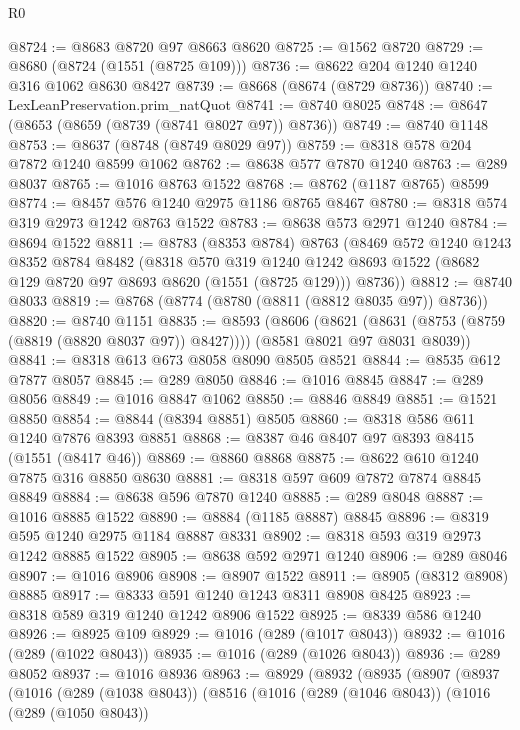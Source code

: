 \begin{lexlean}{R0}
\begin{coremodule}
@8724 := @8683 @8720 @97 @8663 @8620
@8725 := @1562 @8720
@8729 := @8680 (@8724 (@1551 (@8725 @109)))
@8736 := @8622 @204 @1240 @1240 @316 @1062 @8630 @8427
@8739 := @8668 (@8674 (@8729 @8736))
@8740 := LexLeanPreservation.prim_natQuot
@8741 := @8740 @8025
@8748 := @8647 (@8653 (@8659 (@8739 (@8741 @8027 @97)) @8736))
@8749 := @8740 @1148
@8753 := @8637 (@8748 (@8749 @8029 @97))
@8759 := @8318 @578 @204 @7872 @1240 @8599 @1062
@8762 := @8638 @577 @7870 @1240
@8763 := @289 @8037
@8765 := @1016 @8763 @1522
@8768 := @8762 (@1187 @8765) @8599
@8774 := @8457 @576 @1240 @2975 @1186 @8765 @8467
@8780 := @8318 @574 @319 @2973 @1242 @8763 @1522
@8783 := @8638 @573 @2971 @1240
@8784 := @8694 @1522
@8811 := @8783
    (@8353 @8784)
    @8763
    (@8469
      @572
      @1240
      @1243
      @8352
      @8784
      @8482
      (@8318
        @570
        @319
        @1240
        @1242
        @8693
        @1522
        (@8682 @129 @8720 @97 @8693 @8620 (@1551 (@8725 @129)))
        @8736))
@8812 := @8740 @8033
@8819 := @8768 (@8774 (@8780 (@8811 (@8812 @8035 @97)) @8736))
@8820 := @8740 @1151
@8835 := @8593
    (@8606
      (@8621 (@8631 (@8753 (@8759 (@8819 (@8820 @8037 @97)) @8427))))
      (@8581 @8021 @97 @8031 @8039))
@8841 := @8318 @613 @673 @8058 @8090 @8505 @8521
@8844 := @8535 @612 @7877 @8057
@8845 := @289 @8050
@8846 := @1016 @8845
@8847 := @289 @8056
@8849 := @1016 @8847 @1062
@8850 := @8846 @8849
@8851 := @1521 @8850
@8854 := @8844 (@8394 @8851) @8505
@8860 := @8318 @586 @611 @1240 @7876 @8393 @8851
@8868 := @8387 @46 @8407 @97 @8393 @8415 (@1551 (@8417 @46))
@8869 := @8860 @8868
@8875 := @8622 @610 @1240 @7875 @316 @8850 @8630
@8881 := @8318 @597 @609 @7872 @7874 @8845 @8849
@8884 := @8638 @596 @7870 @1240
@8885 := @289 @8048
@8887 := @1016 @8885 @1522
@8890 := @8884 (@1185 @8887) @8845
@8896 := @8319 @595 @1240 @2975 @1184 @8887 @8331
@8902 := @8318 @593 @319 @2973 @1242 @8885 @1522
@8905 := @8638 @592 @2971 @1240
@8906 := @289 @8046
@8907 := @1016 @8906
@8908 := @8907 @1522
@8911 := @8905 (@8312 @8908) @8885
@8917 := @8333 @591 @1240 @1243 @8311 @8908 @8425
@8923 := @8318 @589 @319 @1240 @1242 @8906 @1522
@8925 := @8339 @586 @1240
@8926 := @8925 @109
@8929 := @1016 (@289 (@1017 @8043))
@8932 := @1016 (@289 (@1022 @8043))
@8935 := @1016 (@289 (@1026 @8043))
@8936 := @289 @8052
@8937 := @1016 @8936
@8963 := @8929
    (@8932
      (@8935
        (@8907
          (@8937
            (@1016
              (@289 (@1038 @8043))
              (@8516
                (@1016
                  (@289 (@1046 @8043))
                  (@1016
                    (@289 (@1050 @8043))

\end{coremodule}
\end{lexlean}
